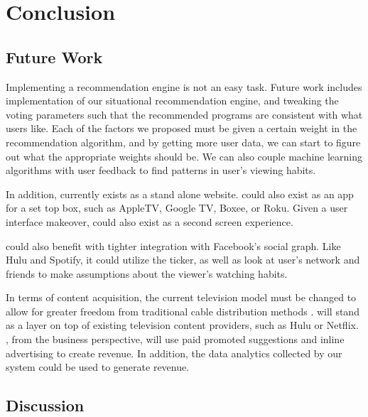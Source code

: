 \section{Conclusion}

\subsection{Future Work}
Implementing a recommendation engine is not an easy task.  Future work
includes implementation of our situational recommendation engine, and
tweaking the voting parameters such that the recommended programs are
consistent with what users like.  Each of the factors we proposed must
be given a certain weight in the recommendation algorithm, and by
getting more user data, we can start to figure out what the
appropriate weights should be.  We can also couple machine learning
algorithms with user feedback to find patterns in user’s viewing
habits.

In addition, {\sys} currently exists as a stand alone website.  {\sys}
could also exist as an app for a set top box, such as AppleTV, Google
TV, Boxee, or Roku.  Given a user interface makeover, {\sys} could
also exist as a second screen experience.

{\sys} could also benefit with tighter integration with Facebook’s
social graph.  Like Hulu and Spotify, it could utilize the ticker, as
well as look at user’s network and friends to make assumptions about
the viewer’s watching habits.

In terms of content acquisition, the current television model must be
changed to allow for greater freedom from traditional cable
distribution methods \cite{montpetit}.  {\sys} will stand as a layer
on top of existing television content providers, such as Hulu or
Netflix.  {\sys}, from the business perspective, will use paid
promoted suggestions and inline advertising to create revenue.  In
addition, the data analytics collected by our system could be used to
generate revenue.

\subsection{Discussion}

